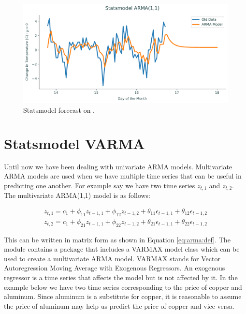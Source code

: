 \begin{figure}[H]
\centering
\includegraphics[width=\textwidth]{figures/sm.pdf}
\caption{Statsmodel forecast on .}
\label{fig:sm}
\end{figure}


\section*{Statsmodel VARMA}
Until now we have been dealing with univariate ARMA models.
Multivariate ARMA models are used when we have multiple time series that can be useful in predicting one another.
For example say we have two time series $z_{t,1}$ and $z_{t,2}$.
The multivariate ARMA(1,1) model is as follows:

\begin{align}
	z_{t,1} = c_1 + \phi_{11} z_{t-1,1} +  \phi_{12} z_{t-1,2} +  \theta_{11} \epsilon_{t-1,1} +  \theta_{12} \epsilon_{t-1,2}
	\\
	z_{t,2} = c_1 + \phi_{21} z_{t-1,1} +  \phi_{22} z_{t-1,2} +  \theta_{21} \epsilon_{t-1,1} +  \theta_{22} \epsilon_{t-1,2}
\end{align}

This can be written in matrix form as shown in Equation \ref{eq:arma:def}.
The module  contains a package that includes a VARMAX model class which can be used to create a multivariate ARMA model.
VARMAX stands for Vector Autoregression Moving Average with Exogenous Regressors. 
An exogenous regressor is a time series that affects the model but is not affected by it.
In the example below we have two time series corresponding to the price of copper and aluminum. 
Since aluminum is a substitute for copper, it is reasonable to assume the price of aluminum may help us predict the price of copper and vice versa.

